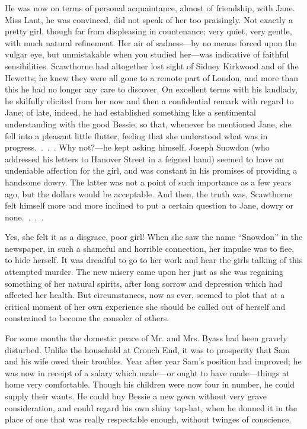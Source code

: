 He was now on terms of personal acquaintance, almost of friendship, with
Jane. Miss Lant, he was convinced, did not speak of her too praisingly.
Not exactly a pretty girl, though far from displeasing in countenance;
very quiet, very gentle, with much natural refinement. Her air of
sadness---by no means forced upon the vulgar eye, but unmistakable when
you studied her---was indicative of faithful sensibilities. Scawthorne
had altogether lost sight of Sidney Kirkwood and of the Hewetts; he knew
they were all gone to a remote part of London, and more than this he had
no longer any care to discover. On excellent terms with his landlady, he
skilfully elicited from her now and then a confidential remark with
regard to Jane; of late, indeed, he had established something like a
sentimental understanding with the good Bessie, so that, whenever he
mentioned Jane, she fell into a pleasant little flutter, feeling that
{}she understood what was in progress{.~.~.~.} Why not?---he kept asking
himself. Joseph Suowdon (who addressed his letters to Hanover Street in
a feigned hand) seemed to have an undeniable affection for the girl, and
was constant in his promises of providing a handsome dowry. The latter
was not a point of such importance as a few years ago, but the dollars
would be acceptable. And then, the truth was, Scawthorne felt himself
more and more inclined to put a certain question to Jane, dowry or
none{.~.~.~.}

Yes, she felt it as a disgrace, poor girl! When she saw the name
``Snowdon'' in the newspaper, in such a shameful and horrible
connection, her impulse was to flee, to hide herself. It was dreadful to
go to her work and hear the girls talking of this attempted murder. The
new misery came upon her just as she was regaining something of her
natural spirits, after long sorrow and depression which had affected her
health. But circumstances, now as ever, seemed to plot that at a
critical moment of her own experience she should be called out of
herself and constrained to become the consoler of others.

{}For some months the domestic peace of Mr. and Mrs. Byass had been
gravely disturbed. Unlike the household at Crouch End, it was to
prosperity that Sam and his wife owed their troubles. Year after year
Sam's position had improved; he was now in receipt of a salary which
made---or ought to have made---things at home very comfortable. Though
his children were now four in number, he could supply their wants. He
could buy Bessie a new gown without very grave consideration, and could
regard his own shiny top-hat, when he donned it in the place of one that
was really respectable enough, without twinges of conscience.

